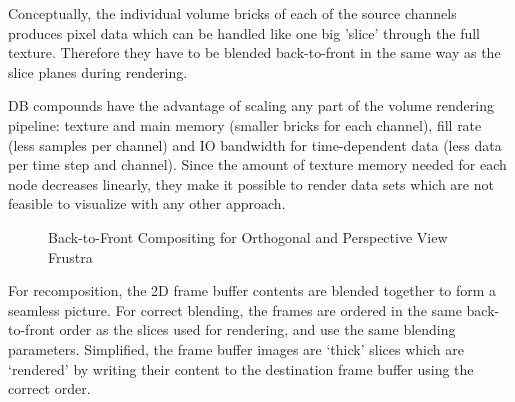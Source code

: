 \documentclass[10pt,a4]{scrartcl}
\begin{document}
Conceptually, the individual volume bricks of each of the source
channels produces pixel data which can be handled like one big 'slice'
through the full texture. Therefore they have to be blen\-ded
back-to-front in the same way as the slice planes during rendering.

DB compounds have the advantage of scaling any part of the volume
rendering pipeline: texture and main memory (smaller bricks for each
channel), fill rate (less samples per channel) and IO bandwidth for
time-dependent data (less data per time step and channel). Since the
amount of texture memory needed for each node decreases linearly, they
make it possible to render data sets which are not feasible to
visualize with any other approach.

\begin{figure}[h!t]
  \hfil
  {\caption{\small\label{fBlend}Back-to-Front Com\-po\-siting for
      Orthogonal and Perspective View Frustra}}
\end{figure}
For recomposition, the 2D frame buffer contents are blended together to
form a seamless picture. For correct blending, the frames are ordered in
the same back-to-front order as the slices used for rendering, and use the
same blending parameters. Simplified, the frame buffer images are
`thick' slices which are `rendered' by writing their content to the
destination frame buffer using the correct order. 
\end{document}
